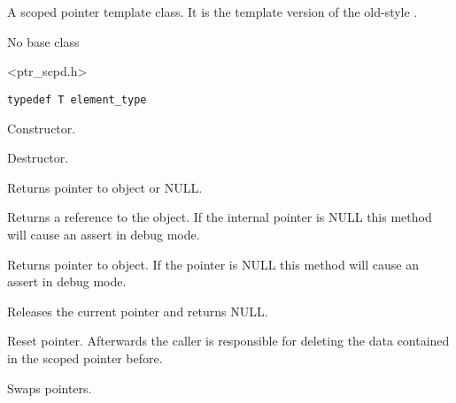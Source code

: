\section{}\label{wxscopedptrtemplate}

A scoped pointer template class. It is the template version of
the old-style .


No base class


<ptr\_scpd.h>


{\small%
\begin{verbatim}
typedef T element_type
\end{verbatim}
}%



\label{wxscopedptrtemplatewxscopedptrtemplate}


Constructor.

\label{wxscopedptrtemplatedtor}


Destructor.

\label{wxscopedptrtemplateget}


Returns pointer to object or NULL.

\label{wxscopedptrtemplateoperatorreft}


Returns a reference to the object. If the internal pointer is NULL
this method will cause an assert in debug mode.

\label{wxscopedptrtemplateoperatorderef}


Returns pointer to object. If the pointer is NULL this method will 
cause an assert in debug mode.

\label{wxscopedptrtemplaterelease}


Releases the current pointer and returns NULL.

\label{wxscopedptrtemplatereset}


Reset pointer. Afterwards the caller is responsible for deleting
the data contained in the scoped pointer before.

\label{wxscopedptrtemplateswap}


Swaps pointers.

